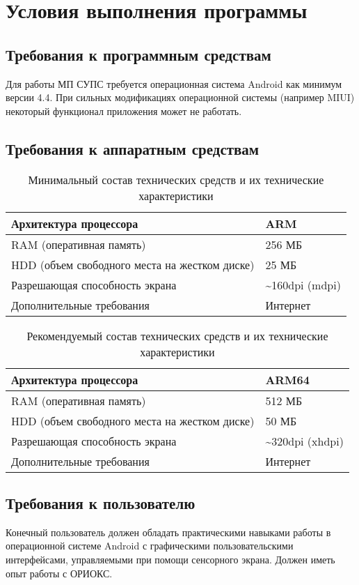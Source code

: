 \chapter{Условия выполнения программы}
\label{ch:conditions}

\section{Требования к программным средствам}
\label{sec:conditions:soft}
Для работы МП СУПС требуется операционная система Android как минимум версии 4.4.
При сильных модификациях операционной системы (например MIUI) некоторый функционал приложения может не работать.

\section{Требования к аппаратным средствам}
\label{sec:conditions:hard}

\begin{table}[ht]
  \centering
  \caption{Минимальный состав технических средств и их технические характеристики}
  \label{tab:rqmtsMin}
  \begin{tabular}{|l|l|}
    \hline Архитектура процессора & ARM \\ \hline
    RAM (оперативная память) & 256 МБ \\ \hline
    HDD (объем свободного места на жестком диске) & 25 МБ \\ \hline
    Разрешающая способность экрана & \textasciitilde 160dpi (mdpi) \\ \hline
    Дополнительные требования & Интернет \\ \hline
  \end{tabular}
\end{table}

\begin{table}[ht]
  \centering
  \caption{Рекомендуемый состав технических средств и их технические характеристики}
  \label{tab:rqmtsRecommended}
  \begin{tabular}{|l|l|}
    \hline Архитектура процессора & ARM64 \\ \hline
    RAM (оперативная память) & 512 МБ \\ \hline
    HDD (объем свободного места на жестком диске) & 50 МБ \\ \hline
    Разрешающая способность экрана & \textasciitilde 320dpi (xhdpi) \\ \hline
    Дополнительные требования & Интернет \\ \hline
  \end{tabular}
\end{table}

\section{Требования к пользователю}
\label{sec:conditions:user}
Конечный пользователь должен обладать практическими навыками работы в операционной системе Android с графическими пользовательскими интерфейсами, управляемыми при помощи сенсорного экрана.
Должен иметь опыт работы с ОРИОКС.
